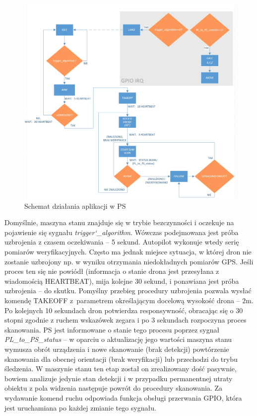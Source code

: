 \begin{figure}[ht]
	\centering
	\includegraphics[width=16cm]{5_PS_FSM.jpg}
	\caption{Schemat działania aplikacji w PS}
	\label{fig:PL_FSM_sch}
\end{figure}

Domyślnie, maszyna stanu znajduje się w trybie bezczynności i oczekuje na pojawienie się sygnału \textit{trigger\char`_algorithm}. 
Wówczas podejmowana jest próba uzbrojenia z czasem oczekiwania -- 5 sekund. 
Autopilot wykonuje wtedy serię pomiarów weryfikacyjnych. 
Często ma jednak miejsce sytuacja, w której dron nie zostanie uzbrojony np. w wyniku otrzymania niedokładnych pomiarów GPS. 
Jeśli proces ten się nie powiódł (informacja o stanie drona jest przesyłana z wiadomością HEARTBEAT), mija kolejne 30 sekund, i ponawiana jest próba uzbrojenia -- do skutku. %
Pomyślny przebieg procedury uzbrojenia pozwala wysłać komendę TAKEOFF z~parametrem określającym docelową wysokość drona -- $2$m. %
Po kolejnych 10 sekundach dron potwierdza responsywność, obracając się o 30 stopni zgodnie z ruchem wskazówek zegara i po 3 sekundach rozpoczyna proces skanowania. 
PS jest informowane o stanie tego procesu poprzez sygnał \textit{PL\_to\_PS\_status} -- w oparciu o aktualizację jego wartości maszyna stanu wymusza obrót urządzenia i nowe skanowanie (brak detekcji) powtórzenie skanowania dla obecnej orientacji (brak weryfikacji) lub przechodzi do trybu śledzenia. 
W maszynie stanu ten etap został on zrealizowany dość pasywnie, bowiem analizuje jedynie stan detekcji i w przypadku permanentnej utraty obiektu z pola widzenia następuje powrót do procedury skanowania. 
Za wydawanie komend ruchu odpowiada funkcja obsługi przerwania GPIO, która jest uruchamiana po każdej zmianie tego sygnału.


